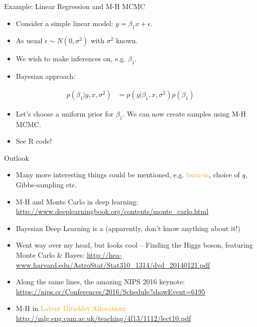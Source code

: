 \documentclass[ignorenonframetext,]{beamer}
\providecommand{\tightlist}{%
  \setlength{\itemsep}{0pt}\setlength{\parskip}{0pt}}
\newcommand{\HIGHLIGHT}[1]{\noindent{\color{blue}#1}}
\newcommand{\orange}[1]{\textcolor{orange}{#1}}
\begin{document}
\begin{frame}{Example: Linear Regression and M-H MCMC}

\begin{itemize}
\tightlist
\item
  Consider a simple linear model: \(y = \beta_1 x + \epsilon\).
\item
  As usual \(\epsilon \sim N(0, \sigma^2)\) with \(\sigma^2\) known.
\item
  We wish to make inferences on, e.g. \(\beta_1\).
\item
  Bayesian approach:
\end{itemize}

\[
\begin{aligned}
p(\beta_1 | y, x, \sigma^2) & = p(y | \beta_1, x, \sigma^2) p(\beta_1)
\end{aligned}
\]

\begin{itemize}
\tightlist
\item
  Let's choose a uniform prior for \(\beta_1\). We can now create
  samples using M-H MCMC.
\item
  See R code!
\end{itemize}

\end{frame}

\begin{frame}{Outlook}

\begin{itemize}
\tightlist
\item
  Many more interesting things could be mentioned, e.g.
  \orange{burn-in}, choice of \(q\), Gibbs-sampling etc.
\item
  M-H and Monte Carlo in deep learning:
  \url{http://www.deeplearningbook.org/contents/monte_carlo.html}
\item
  Bayesian Deep Learning is a \HIGHLIGHT{thing} (apparently, don't know
  anything about it!)
\item
  Went way over my head, but looks cool -- Finding the Higgs boson,
  featuring Monte Carlo \& Bayes:
  \url{http://hea-www.harvard.edu/AstroStat/Stat310_1314/dvd_20140121.pdf}
\item
  Along the same lines, the amazing NIPS 2016 keynote:
  \url{https://nips.cc/Conferences/2016/Schedule?showEvent=6195}
\item
  M-H in \orange{Latent Dirichlet Allocation}:
  \url{http://mlg.eng.cam.ac.uk/teaching/4f13/1112/lect10.pdf}
\end{itemize}

\end{frame}
\end{document}
